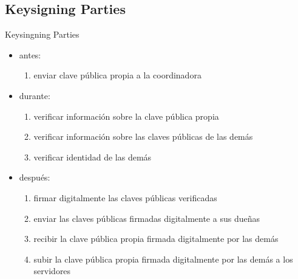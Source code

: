 \documentclass{beamer}
\begin{document}
\subsection{Keysigning Parties}
\begin{frame}{Keysingning Parties}
\begin{itemize}
    \item antes:
        \begin{enumerate}
            \item enviar clave pública propia a la coordinadora
        \end{enumerate}
    \item durante:
        \begin{enumerate}
            \item verificar información sobre la clave pública propia
            \item verificar información sobre las claves públicas de las demás
            \item verificar identidad de las demás
        \end{enumerate}
    \item después:
        \begin{enumerate}
            \item firmar digitalmente las claves públicas verificadas
            \item enviar las claves públicas firmadas digitalmente a sus dueñas
            \item recibir la clave pública propia firmada digitalmente por las demás
            \item subir la clave pública propia firmada digitalmente por las
                demás a los servidores
        \end{enumerate}
\end{itemize}
\end{frame}
\end{document}
